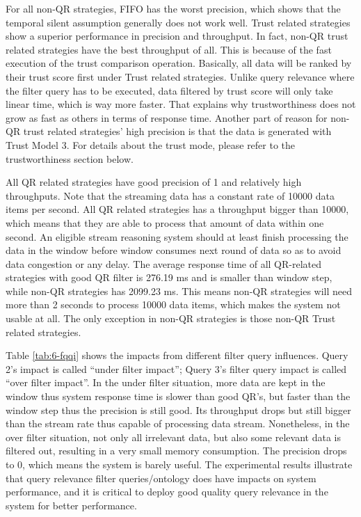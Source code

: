 For all non-QR strategies, FIFO has the worst precision, which shows that the temporal silent assumption generally does not work well.
Trust related strategies show a superior performance in precision and throughput. 
In fact, non-QR trust related strategies have the best throughput of all.
This is because of the fast execution of the trust comparison operation.
Basically, all data will be ranked by their trust score first under Trust related strategies. 
Unlike query relevance where the filter query has to be executed, data filtered by trust score will only take linear time, which is way more faster.
That explains why trustworthiness does not grow as fast as others in terms of response time.
Another part of reason for non-QR trust related strategies' high precision is that the data is generated with Trust Model 3. 
For details about the trust mode, please refer to the trustworthiness section below. 

All QR related strategies have good precision of 1 and relatively high throughputs. 
Note that the streaming data has a constant rate of 10000 data items per second. 
All QR related strategies has a throughput bigger than 10000, which means that they are able to process that amount of data within one second.
An eligible stream reasoning system should at least finish processing the data in the window before window consumes next round of data so as to avoid data congestion or any delay. 
The average response time of all QR-related strategies with good QR filter is 276.19 ms and is smaller than window step, while non-QR strategies has 2099.23 ms. 
This means non-QR strategies will need more than 2 seconds to process 10000 data items, which makes the system not usable at all. 
The only exception in non-QR strategies is those non-QR Trust related strategies. 

Table \ref{tab:6-fqqi} shows the impacts from different filter query influences. 
Query 2's impact is called ``under filter impact''; Query 3's filter query impact is called ``over filter impact''.
In the under filter situation, more data are kept in the window thus system response time is slower than good QR's, but faster than the window step thus the precision is still good.
Its throughput drops but still bigger than the stream rate thus capable of processing data stream. 
Nonetheless, in the over filter situation, not only all irrelevant data, but also some relevant data is filtered out, resulting in a very small memory consumption. 
The precision drops to 0, which means the system is barely useful.
The experimental results illustrate that query relevance filter queries/ontology does have impacts on system performance, and it is critical to deploy good quality query relevance in the system for better performance. 
%
